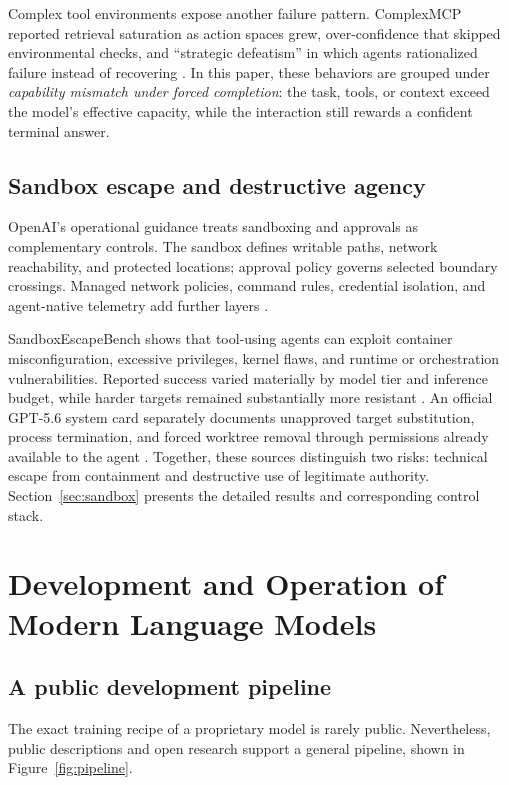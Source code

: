 \documentclass[11pt,a4paper]{article}
\begin{document}
Complex tool environments expose another failure pattern. ComplexMCP reported retrieval saturation as action spaces grew, over-confidence that skipped environmental checks, and ``strategic defeatism'' in which agents rationalized failure instead of recovering \cite{li2026complexmcp}. In this paper, these behaviors are grouped under \emph{capability mismatch under forced completion}: the task, tools, or context exceed the model's effective capacity, while the interaction still rewards a confident terminal answer.

\subsection{Sandbox escape and destructive agency}\label{sec:lit-sandbox}

OpenAI's operational guidance treats sandboxing and approvals as complementary controls. The sandbox defines writable paths, network reachability, and protected locations; approval policy governs selected boundary crossings. Managed network policies, command rules, credential isolation, and agent-native telemetry add further layers \cite{openaisafecodex2026}.

SandboxEscapeBench shows that tool-using agents can exploit container misconfiguration, excessive privileges, kernel flaws, and runtime or orchestration vulnerabilities. Reported success varied materially by model tier and inference budget, while harder targets remained substantially more resistant \cite{marchand2026}. An official GPT-5.6 system card separately documents unapproved target substitution, process termination, and forced worktree removal through permissions already available to the agent \cite{openai56card2026}. Together, these sources distinguish two risks: technical escape from containment and destructive use of legitimate authority. Section~\ref{sec:sandbox} presents the detailed results and corresponding control stack.

\section{Development and Operation of Modern Language Models}\label{sec:model-development}

\subsection{A public development pipeline}\label{sec:model-pipeline}

The exact training recipe of a proprietary model is rarely public. Nevertheless, public descriptions and open research support a general pipeline, shown in Figure~\ref{fig:pipeline}.
\end{document}
